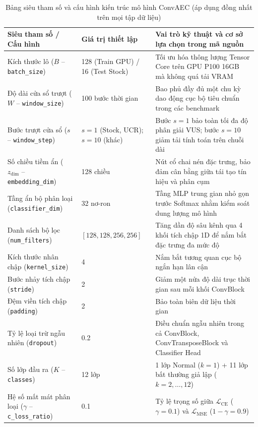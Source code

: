 \documentclass[sigconf,nonacm]{acmart}
\begin{document}
\begin{table}[t]
\centering
\caption{Bảng siêu tham số và cấu hình kiến trúc mô hình ConvAEC (áp dụng đồng nhất trên mọi tập dữ liệu)}
\label{tab:hyperparams}
\footnotesize
\begin{tabularx}{\textwidth}{llX}
\toprule
\textbf{Siêu tham số / Cấu hình} & \textbf{Giá trị thiết lập} & \textbf{Vai trò kỹ thuật và cơ sở lựa chọn trong mã nguồn} \\
\midrule
Kích thước lô ($B$ -- \texttt{batch\_size}) & 128 (Train GPU) / 16 (Test Stock) & Tối ưu hóa thông lượng Tensor Core trên GPU P100 16GB mà không quá tải VRAM \\
Độ dài cửa sổ trượt ($W$ -- \texttt{window\_size}) & 100 bước thời gian & Bao phủ đầy đủ một chu kỳ dao động cục bộ tiêu chuẩn trong các benchmark \\
Bước trượt cửa sổ ($s$ -- \texttt{window\_step}) & $s=1$ (Stock, UCR); $s=10$ (khác) & Bước $s=1$ bảo toàn tối đa độ phân giải VUS; bước $s=10$ giảm tải tính toán trên chuỗi dài \\
Số chiều tiềm ẩn ($z_{\text{dim}}$ -- \texttt{embedding\_dim}) & 128 chiều & Nút cổ chai nén đặc trưng, bảo đảm cân bằng giữa tái tạo tín hiệu và phân cụm \\
Tầng ẩn bộ phân loại (\texttt{classifier\_dim}) & 32 nơ-ron & Tầng MLP trung gian nhỏ gọn trước Softmax nhằm kiểm soát dung lượng mô hình \\
Danh sách bộ lọc (\texttt{num\_filters}) & $[128, 128, 256, 256]$ & Tăng dần độ sâu kênh qua 4 khối tích chập 1D để nắm bắt đặc trưng đa mức độ \\
Kích thước nhân chập (\texttt{kernel\_size}) & 4 & Nắm bắt tương quan cục bộ ngắn hạn lân cận \\
Bước nhảy tích chập (\texttt{stride}) & 2 & Giảm một nửa độ dài trục thời gian sau mỗi khối ConvBlock \\
Đệm viền tích chập (\texttt{padding}) & 2 & Bảo toàn biên dữ liệu thời gian \\
Tỷ lệ loại trừ ngẫu nhiên (\texttt{dropout}) & 0.2 & Điều chuẩn ngẫu nhiên trong cả ConvBlock, ConvTransposeBlock và Classifier Head \\
Số lớp đầu ra ($K$ -- \texttt{classes}) & 12 lớp & 1 lớp Normal ($k=1$) + 11 lớp bất thường giả lập ($k=2, \dots, 12$) \\
Hệ số mất mát phân loại ($\gamma$ -- \texttt{c\_loss\_ratio}) & 0.1 & Tỷ lệ trọng số giữa $\mathcal{L}_{\text{CE}}$ ($\gamma=0.1$) và $\mathcal{L}_{\text{MSE}}$ ($1-\gamma=0.9$) \\

\end{tabularx}
\end{table}
\end{document}
